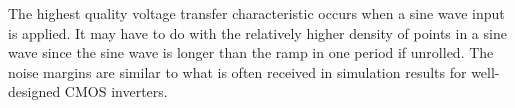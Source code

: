 The highest quality voltage transfer characteristic occurs when a sine wave input is applied. It may have to do with the relatively higher density of points in a sine wave since the sine wave is longer than the ramp in one period if unrolled. The noise margins are similar to what is often received in simulation results for well-designed CMOS inverters.
